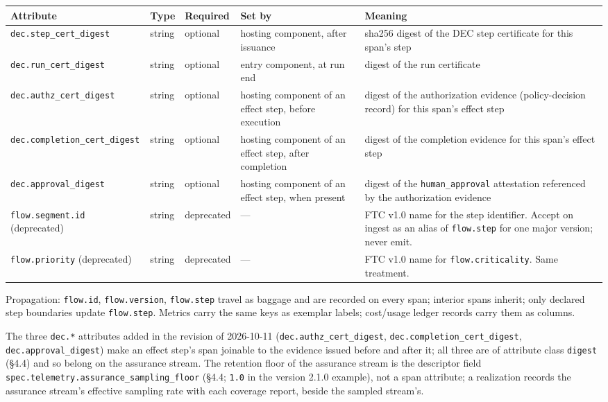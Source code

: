 \documentclass[11pt]{article}
\newcommand{\code}[1]{\texttt{#1}}
\begin{document}
\begin{center}
\footnotesize
\begin{tabular}{@{}p{4.4cm} l l p{3.4cm} p{4.2cm}@{}}
\toprule
\textbf{Attribute} & \textbf{Type} & \textbf{Required} & \textbf{Set by} & \textbf{Meaning} \\
\midrule
\code{dec.step\_cert\_digest} & string & optional & hosting component, after issuance & sha256 digest of the DEC step certificate for this span's step \\
\code{dec.run\_cert\_digest} & string & optional & entry component, at run end & digest of the run certificate \\
\code{dec.authz\_cert\_digest} & string & optional & hosting component of an effect step, before execution & digest of the authorization evidence (policy-decision record) for this span's effect step \\
\code{dec.completion\_cert\_digest} & string & optional & hosting component of an effect step, after completion & digest of the completion evidence for this span's effect step \\
\code{dec.approval\_digest} & string & optional & hosting component of an effect step, when present & digest of the \code{human\_approval} attestation referenced by the authorization evidence \\
\code{flow.segment.id} (deprecated) & string & deprecated & --- & FTC v1.0 name for the step identifier. Accept on ingest as an alias of \code{flow.step} for one major version; never emit. \\
\code{flow.priority} (deprecated) & string & deprecated & --- & FTC v1.0 name for \code{flow.criticality}. Same treatment. \\
\bottomrule
\end{tabular}
\end{center}

Propagation: \code{flow.id}, \code{flow.version}, \code{flow.step} travel as baggage and are recorded on every span; interior spans inherit; only declared step boundaries update \code{flow.step}. Metrics carry the same keys as exemplar labels; cost/usage ledger records carry them as columns.

\begin{sloppypar}
The three \code{dec.*} attributes added in the revision of 2026-10-11 (\code{dec.authz\_cert\_digest}, \code{dec.completion\_cert\_digest}, \code{dec.approval\_digest}) make an effect step's span joinable to the evidence issued before and after it; all three are of attribute class \code{digest} (\S4.4) and so belong on the assurance stream. The retention floor of the assurance stream is the descriptor field \code{spec.telemetry.assurance\_sampling\_floor} (\S4.4; \code{1.0} in the version 2.1.0 example), not a span attribute; a realization records the assurance stream's effective sampling rate with each coverage report, beside the sampled stream's.
\end{sloppypar}
\end{document}
